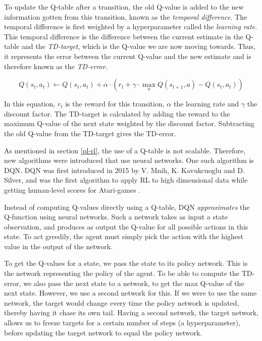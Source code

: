 To update the Q-table after a transition, the old Q-value is added to the new information gotten from this transition, known as the \emph{temporal difference}. The temporal difference is first weighted by a hyperparameter called the \emph{learning rate}. This temporal difference is the difference between the current estimate in the Q-table and the \emph{TD-target}, which is the Q-value we are now moving towards. Thus, it represents the error between the current Q-value and the new estimate and is therefore known as the \emph{TD-error}.

\begin{equation}
Q(s_t,a_t) \leftarrow Q(s_t,a_t) + \alpha \cdot (r_t + \gamma \cdot \max _{a} Q(s_{t+1},a) - Q(s_t,a_t))
\end{equation}

In this equation, $r_t$ is the reward for this transition, $\alpha$ the learning rate and $\gamma$ the discount factor. The TD-target is calculated by adding the reward to the maximum Q-value of the next state weighted by the discount factor. Subtracting the old Q-value from the TD-target gives the TD-error. 

As mentioned in section \ref{pl-rl}, the use of a Q-table is not scalable. Therefore, new algorithms were introduced that use neural networks. One such algorithm is DQN. DQN was first introduced in 2015 by V. Mnih, K. Kavukcuoglu and D. Silver, and was the first algorithm to apply RL to high dimensional data while getting human-level scores for Atari-games \cite{dqn}.

Instead of computing Q-values directly using a Q-table, DQN \emph{approximates} the Q-function using neural networks. Such a network takes as input a state observation, and produces as output the Q-value for all possible actions in this state. To act greedily, the agent must simply pick the action with the highest value in the output of the network.

To get the Q-values for a state, we pass the state to its policy network. This is the network representing the policy of the agent. To be able to compute the TD-error, we also pass the next state to a network, to get the max Q-value of the next state. However, we use a second network for this. If we were to use the same network, the target would change every time the policy network is updated, thereby having it chase its own tail. Having a second network, the target network, allows us to freeze targets for a certain number of steps (a hyperparameter), before updating the target network to equal the policy network.

